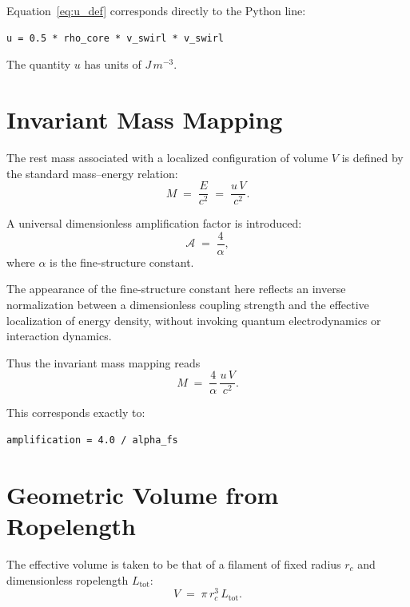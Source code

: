 \documentclass[11pt,a4paper]{article}
\begin{document}
        Equation~\eqref{eq:u_def} corresponds directly to the Python line:
        \begin{verbatim}
u = 0.5 * rho_core * v_swirl * v_swirl
        \end{verbatim}

        The quantity $u$ has units of $\si{J\,m^{-3}}$.

    \section{Invariant Mass Mapping}

        The rest mass associated with a localized configuration of volume $V$ is defined
        by the standard mass--energy relation:
        \begin{equation}
            M \;=\; \frac{E}{c^2} \;=\; \frac{u\,V}{c^2}.
        \end{equation}

        A universal dimensionless amplification factor is introduced:
        \begin{equation}
            \mathcal{A} \;=\; \frac{4}{\alpha},
        \end{equation}
        where $\alpha$ is the fine-structure constant.

        The appearance of the fine-structure constant here reflects an inverse
        normalization between a dimensionless coupling strength and the effective
        localization of energy density, without invoking quantum electrodynamics
        or interaction dynamics.


        Thus the invariant mass mapping reads
        \begin{equation}
            M \;=\; \frac{4}{\alpha}\,\frac{u\,V}{c^2}.
            \label{eq:base_mass}
        \end{equation}

        This corresponds exactly to:
        \begin{verbatim}
amplification = 4.0 / alpha_fs
        \end{verbatim}

    \section{Geometric Volume from Ropelength}

        The effective volume is taken to be that of a filament of fixed radius $r_c$
        and dimensionless ropelength $L_{\text{tot}}$:
        \begin{equation}
            V \;=\; \pi\,r_c^3\,L_{\text{tot}} .
            \label{eq:volume}
        \end{equation}
\end{document}
